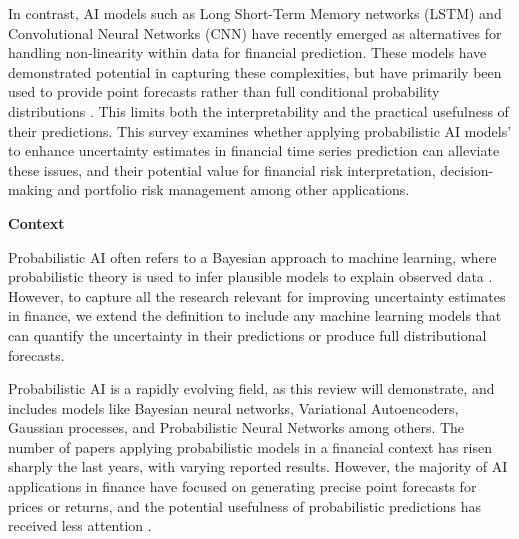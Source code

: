 In contrast, AI models such as Long Short-Term Memory networks (LSTM) and Convolutional Neural Networks (CNN) have recently emerged as alternatives for handling non-linearity within data for financial prediction. These models have demonstrated potential in capturing these complexities, but have primarily been used to provide point forecasts rather than full conditional probability distributions \parencite{Tang2022Survey}. This limits both the interpretability and the practical usefulness of their predictions. This survey examines whether applying probabilistic AI models' to enhance uncertainty estimates in financial time series prediction can alleviate these issues, and their potential value for financial risk interpretation, decision-making and portfolio risk management among other applications. 


\textbf{Context}\nopagebreak

Probabilistic AI often refers to a Bayesian approach to machine learning, where probabilistic theory is used to infer plausible models to explain observed data \parencite{Ghahramani2015}. However, to capture all the research relevant for improving uncertainty estimates in finance, we extend the definition to include any machine learning models that can quantify the uncertainty in their predictions or produce full distributional forecasts.

Probabilistic AI is a rapidly evolving field, as this review will demonstrate, and includes models like Bayesian neural networks, Variational Autoencoders, Gaussian processes, and Probabilistic Neural Networks among others. The number of papers applying probabilistic models in a financial context has risen sharply the last years, with varying reported results. However, the majority of AI applications in finance have focused on generating precise point forecasts for prices or returns, and the potential usefulness of probabilistic predictions has received less attention \parencite{sezer2020financial}.

